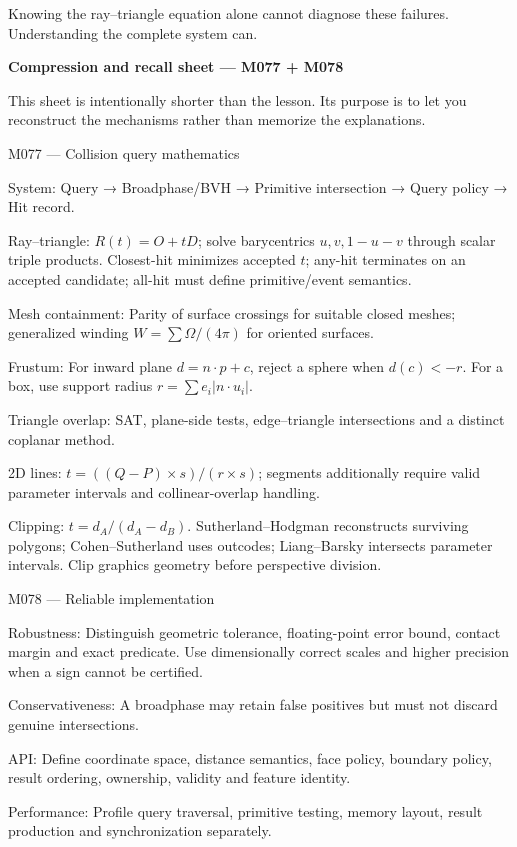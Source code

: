 Knowing the ray--triangle equation alone cannot diagnose these failures. Understanding the complete system can.

\textbf{Compression and recall sheet --- M077 + M078}

This sheet is intentionally shorter than the lesson. Its purpose is to let you reconstruct the mechanisms rather than memorize the explanations.

M077 --- Collision query mathematics

System: Query → Broadphase/BVH → Primitive intersection → Query policy → Hit record.

Ray--triangle: \(R(t)=O+tD\); solve barycentrics \(u,v,1-u-v\) through scalar triple products. Closest-hit minimizes accepted \(t\); any-hit terminates on an accepted candidate; all-hit must define primitive/event semantics.

Mesh containment: Parity of surface crossings for suitable closed meshes; generalized winding \(W=\sum\Omega/(4\pi)\) for oriented surfaces.

Frustum: For inward plane \(d=n\cdot p+c\), reject a sphere when \(d(c)<-r\). For a box, use support radius \(r=\sum e_i|n\cdot u_i|\).

Triangle overlap: SAT, plane-side tests, edge--triangle intersections and a distinct coplanar method.

2D lines: \(t=((Q-P)\times s)/(r\times s)\); segments additionally require valid parameter intervals and collinear-overlap handling.

Clipping: \(t=d_A/(d_A-d_B)\). Sutherland--Hodgman reconstructs surviving polygons; Cohen--Sutherland uses outcodes; Liang--Barsky intersects parameter intervals. Clip graphics geometry before perspective division.

M078 --- Reliable implementation

Robustness: Distinguish geometric tolerance, floating-point error bound, contact margin and exact predicate. Use dimensionally correct scales and higher precision when a sign cannot be certified.

Conservativeness: A broadphase may retain false positives but must not discard genuine intersections.

API: Define coordinate space, distance semantics, face policy, boundary policy, result ordering, ownership, validity and feature identity.

Performance: Profile query traversal, primitive testing, memory layout, result production and synchronization separately.


